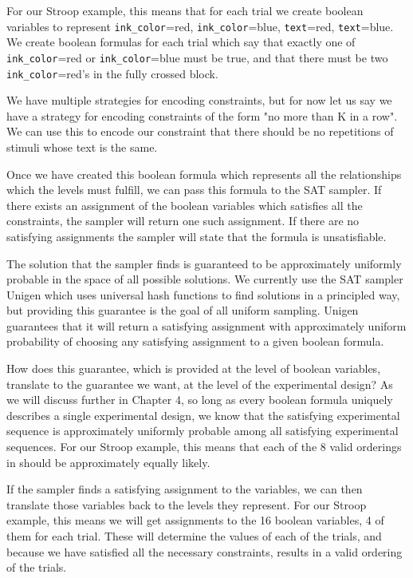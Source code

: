 For our Stroop example, this means that for each trial we create boolean variables to represent \texttt{ink\_color}=red, \texttt{ink\_color}=blue, \texttt{text}=red, \texttt{text}=blue. We create boolean formulas for each trial which say that exactly one of \texttt{ink\_color}=red or \texttt{ink\_color}=blue must be true, and that there must be two \texttt{ink\_color}=red's in the fully crossed block.

We have multiple strategies for encoding constraints, but for now let us say we have a strategy for encoding constraints of the form "no more than K in a row". We can use this to encode our constraint that there should be no repetitions of stimuli whose text is the same.

Once we have created this boolean formula which represents all the relationships which the levels must fulfill, we can pass this formula to the SAT sampler. If there exists an assignment of the boolean variables which satisfies all the constraints, the sampler will return one such assignment. If there are no satisfying assignments the sampler will state that the formula is unsatisfiable.

The solution that the sampler finds is guaranteed to be approximately uniformly probable in the space of all possible solutions. We currently use the SAT sampler Unigen which uses universal hash functions to find solutions in a principled way, but providing this guarantee is the goal of all uniform sampling. Unigen guarantees that it will return a satisfying assignment with approximately uniform probability of choosing any satisfying assignment to a given boolean formula.

How does this guarantee, which is provided at the level of boolean variables, translate to the guarantee we want, at the level of the experimental design? As we will discuss further in Chapter 4, so long as every boolean formula uniquely describes a single experimental design, we know that the satisfying experimental sequence is approximately uniformly probable among all satisfying experimental sequences. For our Stroop example, this means that each of the 8 valid orderings in  should be approximately equally likely.

If the sampler finds a satisfying assignment to the variables, we can then translate those variables back to the levels they represent. For our Stroop example, this means we will get assignments to the 16 boolean variables, 4 of them for each trial. These will determine the values of each of the trials, and because we have satisfied all the necessary constraints, results in a valid ordering of the trials.
